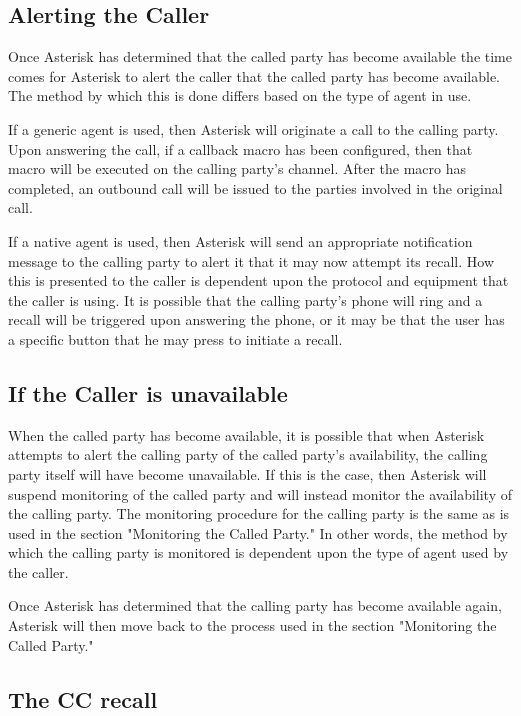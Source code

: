 \subsection{Alerting the Caller}

	Once Asterisk has determined that the called party has become available
the time comes for Asterisk to alert the caller that the called party has
become available. The method by which this is done differs based on the
type of agent in use.

	If a generic agent is used, then Asterisk will originate a call to
the calling party. Upon answering the call, if a callback macro has
been configured, then that macro will be executed on the calling
party's channel. After the macro has completed, an outbound call
will be issued to the parties involved in the original call.

	If a native agent is used, then Asterisk will send an appropriate
notification message to the calling party to alert it that it may now
attempt its recall. How this is presented to the caller is dependent
upon the protocol and equipment that the caller is using. It is
possible that the calling party's phone will ring and a recall will
be triggered upon answering the phone, or it may be that the user
has a specific button that he may press to initiate a recall.

\subsection{If the Caller is unavailable}

	When the called party has become available, it is possible that
when Asterisk attempts to alert the calling party of the called party's
availability, the calling party itself will have become unavailable.
If this is the case, then Asterisk will suspend monitoring of the
called party and will instead monitor the availability of the calling
party. The monitoring procedure for the calling party is the same
as is used in the section "Monitoring the Called Party." In other
words, the method by which the calling party is monitored is dependent
upon the type of agent used by the caller.

	Once Asterisk has determined that the calling party has become
available again, Asterisk will then move back to the process used
in the section "Monitoring the Called Party."

\subsection{The CC recall}

